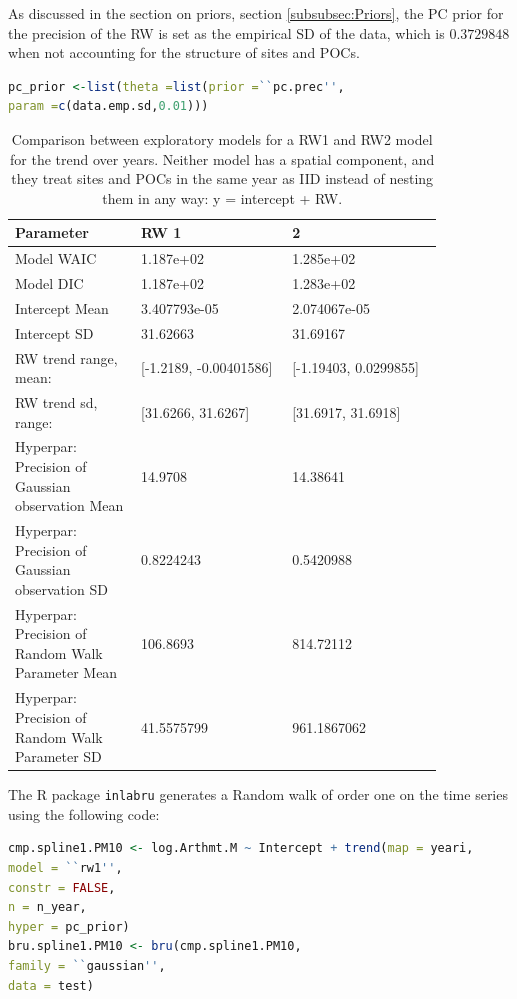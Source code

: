 As discussed in the section on priors, section \ref{subsubsec:Priors}, the \ac{PC} prior for the precision of the RW is set as the empirical SD of the data, which is $0.3729848$ when not accounting for the structure of sites and \ac{POC}s.
\begin{lstlisting}[language=R]
pc_prior <-list(theta =list(prior =``pc.prec'',
param =c(data.emp.sd,0.01)))
\end{lstlisting}

\begin{table}[ht]
\centering
\begin{tabular}{p{0.25\linewidth}|p{0.30\linewidth}|p{0.30\linewidth}}
	Parameter & RW 1 &  2 \\ \hline
	Model WAIC & 1.187e+02 & 1.285e+02\\
	Model DIC & 1.187e+02 & 1.283e+02 \\
	\hline
	Intercept Mean & 3.407793e-05 & 2.074067e-05 \\
	Intercept SD & 31.62663 & 31.69167 \\
	\hline
	RW trend range, mean: & [-1.2189, -0.00401586] & [-1.19403, 0.0299855] \\
	RW trend sd, range: & [31.6266, 31.6267] & [31.6917, 31.6918] \\
	\hline
	Hyperpar: Precision of Gaussian observation Mean & 14.9708 & 14.38641 \\
	Hyperpar: Precision of Gaussian observation SD & 0.8224243 & 0.5420988 \\
	Hyperpar: Precision of Random Walk Parameter Mean & 106.8693 & 814.72112 \\
	Hyperpar: Precision of Random Walk Parameter SD & 41.5575799 & 961.1867062 \\
	
\end{tabular}
\caption{Comparison between exploratory models for a \ac{RW}1 and \ac{RW}2 model for the trend over years.  Neither model has a spatial component, and they treat sites and \ac{POC}s in the same year as \ac{IID} instead of nesting them in any way: y = intercept + RW. }
\label{tab:RW_parameters}
\end{table}

The R package \lstinline{inlabru} generates a Random walk of order one on the time series using the following code:
\begin{lstlisting}[language = R]
cmp.spline1.PM10 <- log.Arthmt.M ~ Intercept + trend(map = yeari,
model = ``rw1'',
constr = FALSE,
n = n_year,
hyper = pc_prior)
bru.spline1.PM10 <- bru(cmp.spline1.PM10,
family = ``gaussian'',
data = test)

\end{lstlisting}

